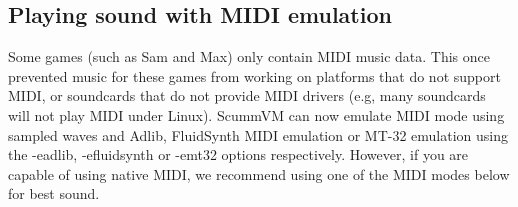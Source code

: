 

\subsection{Playing sound with MIDI emulation}

Some games (such as Sam and Max) only contain MIDI music data.  This once
prevented music for these games from working on platforms that do not support
MIDI, or soundcards that do not provide MIDI drivers (e.g, many soundcards will
not play MIDI under Linux). ScummVM can now emulate MIDI mode using sampled
waves and Adlib, FluidSynth MIDI emulation or MT-32 emulation using the
-eadlib, -efluidsynth or -emt32 options respectively.  However, if you are
capable of using native MIDI, we recommend using one of the MIDI modes below
for best sound.
